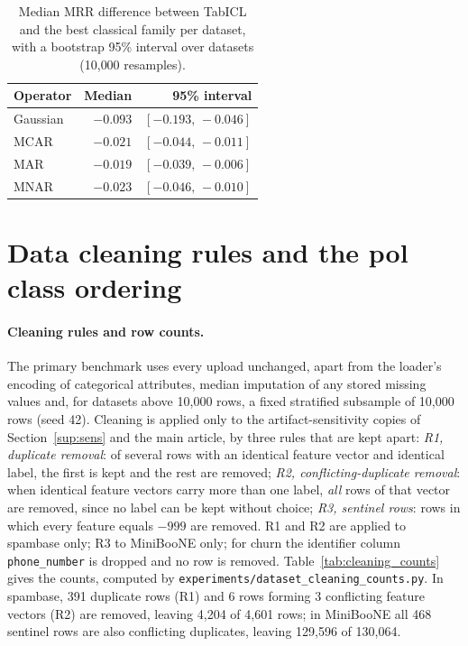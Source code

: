 \documentclass[pdflatex,sn-mathphys]{sn-jnl}
\theoremstyle{thmstyleone}
\begin{document}
\begin{table}[t]
\centering
\footnotesize
\caption{Median MRR difference between TabICL and the best classical family per dataset{,} with a bootstrap 95\% interval over datasets (10{,}000 resamples).}
\label{tab:sens_gap}
\begin{tabular}{@{}lrr@{}}
\toprule
Operator & Median & 95\% interval \\
\midrule
Gaussian & $-0.093$ & $[-0.193,\,-0.046]$ \\
MCAR & $-0.021$ & $[-0.044,\,-0.011]$ \\
MAR & $-0.019$ & $[-0.039,\,-0.006]$ \\
MNAR & $-0.023$ & $[-0.046,\,-0.010]$ \\
\bottomrule
\end{tabular}
\end{table}

\clearpage
\section{Data cleaning rules and the pol class ordering}\label{sup:cleaning}

\paragraph{Cleaning rules and row counts.} The primary benchmark uses every upload unchanged, apart from the loader's encoding of categorical attributes, median imputation of any stored missing values and, for datasets above 10{,}000 rows, a fixed stratified subsample of 10{,}000 rows (seed 42). Cleaning is applied only to the artifact-sensitivity copies of Section~\ref{sup:sens} and the main article, by three rules that are kept apart: \emph{R1, duplicate removal}: of several rows with an identical feature vector and identical label, the first is kept and the rest are removed; \emph{R2, conflicting-duplicate removal}: when identical feature vectors carry more than one label, \emph{all} rows of that vector are removed, since no label can be kept without choice; \emph{R3, sentinel rows}: rows in which every feature equals $-999$ are removed. R1 and R2 are applied to spambase only; R3 to MiniBooNE only; for churn the identifier column \texttt{phone\_number} is dropped and no row is removed. Table~\ref{tab:cleaning_counts} gives the counts, computed by \texttt{experiments/dataset\_cleaning\_counts.py}. In spambase, 391 duplicate rows (R1) and 6 rows forming 3 conflicting feature vectors (R2) are removed, leaving 4{,}204 of 4{,}601 rows; in MiniBooNE all 468 sentinel rows are also conflicting duplicates, leaving 129{,}596 of 130{,}064.
\end{document}
